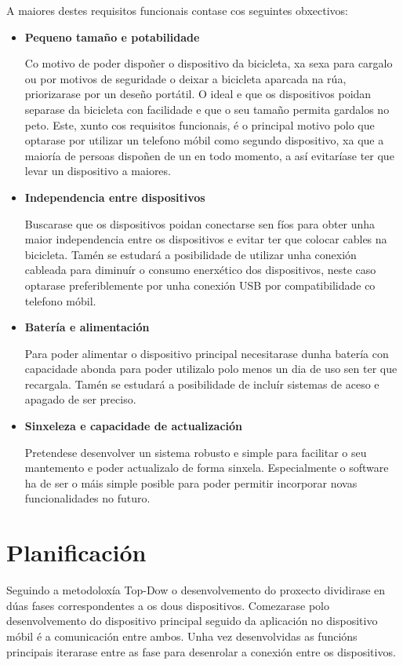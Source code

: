 A maiores destes requisitos funcionais contase cos seguintes obxectivos:
\begin{itemize}
    \item \textbf{Pequeno tamaño e potabilidade}

Co motivo de poder dispoñer o dispositivo da bicicleta, xa sexa para cargalo ou por motivos de seguridade o deixar a bicicleta aparcada na rúa, priorizarase por un deseño portátil. O ideal e que os dispositivos poidan separase da bicicleta con facilidade e que o seu tamaño permita gardalos no peto. Este, xunto cos requisitos funcionais, é o principal motivo polo que optarase por utilizar un telefono móbil como segundo dispositivo, xa que a maioría de persoas dispoñen de un en todo momento, a así evitaríase ter que levar un dispositivo a maiores.

    \item \textbf{Independencia entre dispositivos}

Buscarase que os dispositivos poidan conectarse sen fíos para obter unha maior independencia entre os dispositivos e evitar ter que colocar cables na bicicleta. Tamén se estudará a posibilidade de utilizar unha conexión cableada para diminuír o consumo enerxético dos dispositivos, neste caso optarase preferiblemente por unha conexión USB por compatibilidade co telefono móbil.

    \item \textbf{Batería e alimentación}

Para poder alimentar o dispositivo principal necesitarase dunha batería con capacidade abonda para poder utilizalo polo menos un dia de uso sen ter que recargala. Tamén se estudará a posibilidade de incluír sistemas de aceso e apagado de ser preciso.

    \item \textbf{Sinxeleza e capacidade de actualización}

Pretendese desenvolver un sistema robusto e simple para facilitar o seu mantemento e poder actualizalo de forma sinxela. Especialmente o software ha de ser o máis simple posible para poder permitir incorporar novas funcionalidades no futuro.
\end{itemize}
\section{Planificación}

Seguindo a metodoloxía Top-Dow o desenvolvemento do proxecto dividirase en dúas fases correspondentes a os dous dispositivos. Comezarase polo desenvolvemento do dispositivo principal seguido da aplicación no dispositivo móbil é a comunicación entre ambos. Unha vez desenvolvidas as funcións principais iterarase entre as fase para desenrolar a conexión entre os dispositivos.

